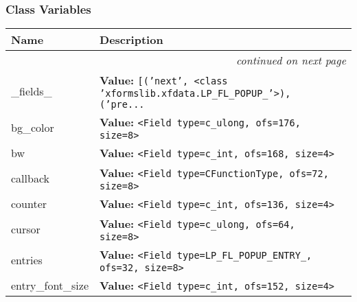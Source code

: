 
  \subsubsection{Class Variables}

    \vspace{-1cm}
\hspace{\varindent}\begin{longtable}{|p{\varnamewidth}|p{\vardescrwidth}|l}
\cline{1-2}
\cline{1-2} \centering \textbf{Name} & \centering \textbf{Description}& \\
\cline{1-2}
\endhead\cline{1-2}\multicolumn{3}{r}{\small\textit{continued on next page}}\\\endfoot\cline{1-2}
\endlastfoot\raggedright \_\-f\-i\-e\-l\-d\-s\-\_\- & \raggedright \textbf{Value:} 
{\tt \texttt{[}\texttt{(}\texttt{'}\texttt{next}\texttt{'}\texttt{, }{\textless}class 'xformslib.xfdata.LP\_FL\_POPUP\_'{\textgreater}\texttt{)}\texttt{, }\texttt{(}\texttt{'}\texttt{pre}\texttt{...}}&\\
\cline{1-2}
\raggedright b\-g\-\_\-c\-o\-l\-o\-r\- & \raggedright \textbf{Value:} 
{\tt {\textless}Field type=c\_ulong, ofs=176, size=8{\textgreater}}&\\
\cline{1-2}
\raggedright b\-w\- & \raggedright \textbf{Value:} 
{\tt {\textless}Field type=c\_int, ofs=168, size=4{\textgreater}}&\\
\cline{1-2}
\raggedright c\-a\-l\-l\-b\-a\-c\-k\- & \raggedright \textbf{Value:} 
{\tt {\textless}Field type=CFunctionType, ofs=72, size=8{\textgreater}}&\\
\cline{1-2}
\raggedright c\-o\-u\-n\-t\-e\-r\- & \raggedright \textbf{Value:} 
{\tt {\textless}Field type=c\_int, ofs=136, size=4{\textgreater}}&\\
\cline{1-2}
\raggedright c\-u\-r\-s\-o\-r\- & \raggedright \textbf{Value:} 
{\tt {\textless}Field type=c\_ulong, ofs=64, size=8{\textgreater}}&\\
\cline{1-2}
\raggedright e\-n\-t\-r\-i\-e\-s\- & \raggedright \textbf{Value:} 
{\tt {\textless}Field type=LP\_FL\_POPUP\_ENTRY\_, ofs=32, size=8{\textgreater}}&\\
\cline{1-2}
\raggedright e\-n\-t\-r\-y\-\_\-f\-o\-n\-t\-\_\-s\-i\-z\-e\- & \raggedright \textbf{Value:} 
{\tt {\textless}Field type=c\_int, ofs=152, size=4{\textgreater}}&\\

\end{longtable}
